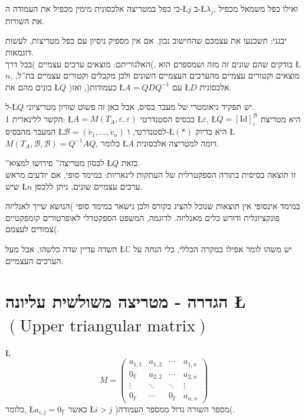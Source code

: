 \documentclass[english,hebrew]{article}
\begin{document}
כי כפל במטריצה אלכסונית מימין מכפיל את העמודה ה-\L{$j$} ב-\L{$\lambda_{j}$},
ואילו כפל משמאל מכפיל את השורות. 

יבגני: תשכנעו את עצמכם שהחישוב נכון. אם אין מספיק ניסיון עם כפל מטריצות,
לעשות דוגמאות.\\

האלגוריתם: מוצאים ערכים עצמיים )בכל דרך(, בודקים שהם שונים זה מזה
ושמספרם הוא \L{$n$}, מוצאים וקטורים עצמיים מהערכים העצמיים השונים
ולכן מקבלים וקטורים עצמיים בת\textquotedblright ל, בונים מהם את \L{$Q$}
)כעמודות(, ואז \L{$A=QDQ^{-1}$} עם \L{$D$} אלכסונית.

ל-\L{$Q$} יש תפקיד גיאומטרי של מעבר בסיס, אבל כאן זה פשוט שוויון
מטריציוני.\\

הקשר ללינארית 1: \L{$A=M(T_{A},\varepsilon,\varepsilon)$} בבסיס הסטנדרטי
\L{$\varepsilon$}, \L{$Q=[\text{Id}]_{\varepsilon}^{\mathcal{B}}$}
היא מטריצת המעבר מהבסיס \L{$\mathcal{B}=(\check{v}_{1},\dots,\check{v}_{n})$}
לסטנדרטי, ו-\L{$(*)$} היא בדיוק \L{$M(T_{A},\mathcal{B},\mathcal{B})=Q^{-1}AQ$},
כלומר \L{$A$} דומה למטריצה אלכסונית.

\textquotedblright לכסון מטריצה\textquotedblright{} פירושו למצוא \L{$Q$}
כזאת.\\

זו תוצאה בסיסית בתורה הספקטרלית של העתקות לינאריות: במימד סופי, אם
יודעים מראש שיש \L{$n$} ערכים עצמיים שונים, ניתן ללכסן. 

במימד אינסופי אין תוצאות שנוכל להציג בקורס ולכן נישאר במימד סופי )הנושא
שייך לאנליזה פונקציונלית ודורש כלים מאנליזה. לדוגמה, המשפט הספקטרלי
לאופרטורים קומפקטיים צמודים לעצמם(.

השדה עדיין שדה כלשהו, אבל מעל \L{$\mathbb{C}$} יש משהו לומר אפילו
במקרה הכללי, בלי הנחה על הערכים העצמיים.

\section{הגדרה - מטריצה משולשית עליונה \L{$(\text{Upper triangular matrix})$}}

\L{%
\[
M=\begin{pmatrix}a_{1,1} & a_{1,2} & \cdots & a_{1,n}\\
0_{\mathbb{F}} & a_{2,2} & \cdots & a_{2,n}\\
\vdots & \ddots & \ddots & \vdots\\
0_{\mathbb{F}} & \cdots & 0_{\mathbb{F}} & a_{n,n}
\end{pmatrix}
\]
}%
כלומר, \L{$a_{i,j}=0_{\mathbb{F}}$} כאשר \L{$i>j$} )מספר השורה גדול
ממספר העמודה(. 
\end{document}
